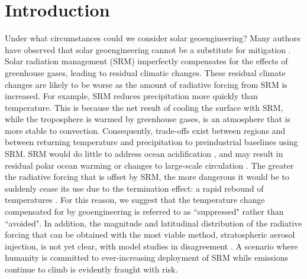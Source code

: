 \documentclass[draft]{agujournal2019}
\begin{document}
%
%
%
%


\section{Introduction}


Under what circumstances could we consider solar geoengineering? Many authors have observed that solar geoengineering cannot be a substitute for mitigation \cite{goes2011economics} \cite{keith2016solar}.  Solar radiation management (SRM) imperfectly compensates for the effects of greenhouse gases, leading to residual climatic changes. These residual climate changes are likely to be worse as the amount of radiative forcing from SRM is increased. For example, SRM reduces precipitation more quickly than temperature. This is because the net result of cooling the surface with SRM, while the troposphere is warmed by greenhouse gases, is an atmosphere that is more stable to convection. Consequently, trade-offs exist between regions and between returning temperature and precipitation to preindustrial baselines using SRM. \cite{moreno2012simple} SRM would do little to address ocean acidification \cite{williamson2012ocean}, and may result in residual polar ocean warming or changes to large-scale circulation \cite{fasullo2018persistent}. The greater the radiative forcing that is offset by SRM, the more dangerous it would be to suddenly cease its use due to the termination effect: a rapid rebound of temperatures \cite{jones2013impact}. For this reason, we suggest that the temperature change compensated for by geoengineering is referred to as ``suppressed" rather than ``avoided". In addition, the magnitude and latitudinal distribution of the radiative forcing that can be obtained with the most viable method, stratospheric aerosol injection, is not yet clear, with model studies in disagreement \cite{niemeier2015limit} \cite{kleinschmitt2018sensitivity}. A scenario where humanity is committed to ever-increasing deployment of SRM while emissions continue to climb is evidently fraught with risk.
\end{document}
